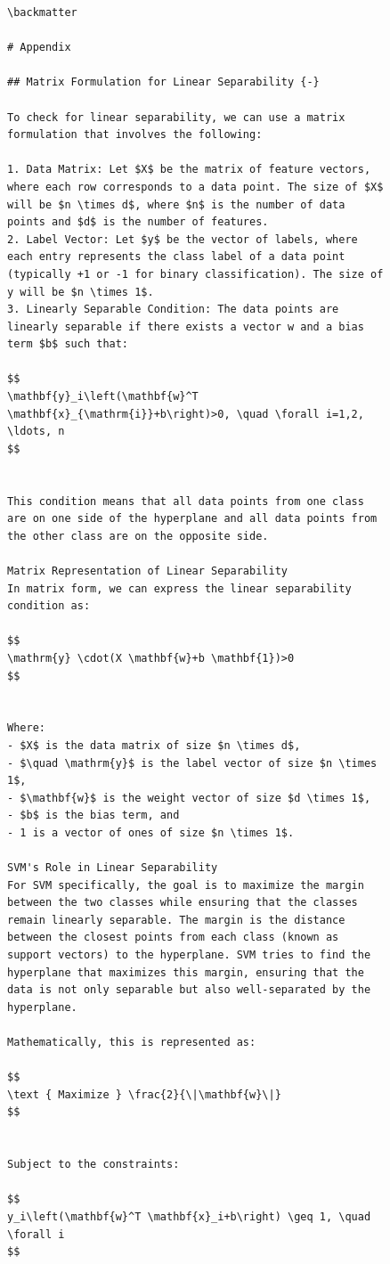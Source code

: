 \documentclass[
  12 pt,
  a4paper,
]{book}
\numberwithin{equation}{section}
\theoremstyle{plain}      %
\theoremstyle{definition} %
\theoremstyle{remark}     %
\theoremstyle{note}         %
\begin{document}
\begin{figure}
\begin{verbatim}
\backmatter

# Appendix

## Matrix Formulation for Linear Separability {-}

To check for linear separability, we can use a matrix formulation that involves the following:

1. Data Matrix: Let $X$ be the matrix of feature vectors, where each row corresponds to a data point. The size of $X$ will be $n \times d$, where $n$ is the number of data points and $d$ is the number of features.
2. Label Vector: Let $y$ be the vector of labels, where each entry represents the class label of a data point (typically +1 or -1 for binary classification). The size of y will be $n \times 1$.
3. Linearly Separable Condition: The data points are linearly separable if there exists a vector w and a bias term $b$ such that:

$$
\mathbf{y}_i\left(\mathbf{w}^T \mathbf{x}_{\mathrm{i}}+b\right)>0, \quad \forall i=1,2, \ldots, n
$$


This condition means that all data points from one class are on one side of the hyperplane and all data points from the other class are on the opposite side.

Matrix Representation of Linear Separability
In matrix form, we can express the linear separability condition as:

$$
\mathrm{y} \cdot(X \mathbf{w}+b \mathbf{1})>0
$$


Where:
- $X$ is the data matrix of size $n \times d$,
- $\quad \mathrm{y}$ is the label vector of size $n \times 1$,
- $\mathbf{w}$ is the weight vector of size $d \times 1$,
- $b$ is the bias term, and
- 1 is a vector of ones of size $n \times 1$.

SVM's Role in Linear Separability
For SVM specifically, the goal is to maximize the margin between the two classes while ensuring that the classes remain linearly separable. The margin is the distance between the closest points from each class (known as support vectors) to the hyperplane. SVM tries to find the hyperplane that maximizes this margin, ensuring that the data is not only separable but also well-separated by the hyperplane.

Mathematically, this is represented as:

$$
\text { Maximize } \frac{2}{\|\mathbf{w}\|}
$$


Subject to the constraints:

$$
y_i\left(\mathbf{w}^T \mathbf{x}_i+b\right) \geq 1, \quad \forall i
$$



\end{verbatim}
\end{figure}
\end{document}
